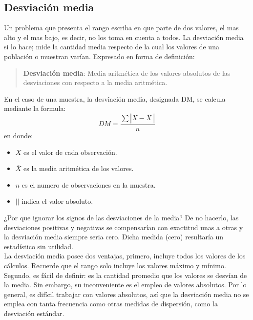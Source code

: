 \documentclass[]{article}
\begin{document}
\subsection*{Desviación media}
Un problema que presenta el rango escriba en que parte de dos valores, el mas alto y el mas bajo, es decir, no los toma en cuenta a todos. La desviación media si lo hace; mide la cantidad media respecto de la cual los valores de una población o muestran varían. Expresado en forma de definición:
\begin{quotation}
	\item \textbf{Desviación media}: Media aritmética de los valores absolutos de las desviaciones con respecto a la media aritmética.
\end{quotation}
En el caso de una muestra, la desviación media, designada DM, se calcula mediante la formula:
\[  DM = \frac{\sum |X - \overline{X}\ |}{n}\]
en donde:
\begin{itemize}
	\item $X$ es el valor de cada observación.
	\item $\overline{X}$ es la media aritmética de los valores.
	\item $n$ es el numero de observaciones en la muestra.
	\item $||$ indica el valor absoluto.
\end{itemize}
¿Por que ignorar los signos de las desviaciones de la media? De no hacerlo, las desviaciones positivas y negativas se compensarían con exactitud unas a otras y la desviación media siempre seria cero. Dicha medida (cero) resultaría un estadístico sin utilidad.\\
La desviación media posee dos ventajas, primero, incluye todos los valores de los cálculos. Recuerde que el rango solo incluye los valores máximo y mínimo. Segundo, es fácil de definir: es la cantidad promedio que los valores se desvían de la media. Sin embargo, su inconveniente es el empleo de valores absolutos. Por lo general, es difícil trabajar con valores absolutos, así que la desviación media no se emplea con tanta frecuencia como otras medidas de dispersión, como la desviación estándar.
\end{document}
